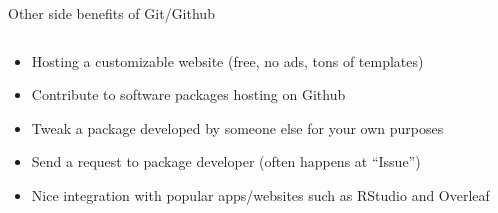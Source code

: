 \documentclass[handout,pdftex,10pt,aspectratio=169]{beamer}
\begin{document}
\begin{frame}{Other side benefits of Git/Github}
  \begin{columns}[c]
    \begin{column}{0.46\linewidth}
      \begin{itemize}\setlength\itemsep{10pt}
        \item<1-> Hosting a customizable website (free, no ads, tons of templates)
        \item<2-> Contribute to software packages hosting on Github
        \item<3-> Tweak a package developed by someone else for your own purposes
        \item<4-> Send a request to package developer (often happens at ``Issue'')
        \item<5-> Nice integration with popular apps/websites such as RStudio and Overleaf 
      \end{itemize}
    \end{column}\hfill
    \begin{column}{0.53\linewidth}
      \centering

\end{column}
\end{columns}
\end{frame}
\end{document}
